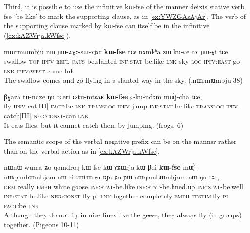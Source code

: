 \documentclass[oldfontcommands,oneside,a4paper,11pt]{article}
\newcommand{\ipa}[1]{{\phon \mbox{#1}}} %
\begin{document}
 

Third, it is possible to use the infinitive   \ipa{kɯ-fse} of the manner deixis stative verb \ipa{fse} `be like' to mark the supporting clause, as in \ref{ex:YWZGAsAjAr}. The verb of the supporting clause marked by   \ipa{kɯ-fse} can itself be in the infinitive (\ref{ex:kAZWrja.kWfse}).
\begin{exe}
\ex \label{ex:YWZGAsAjAr}
\gll
 	\ipa{mɯrmɯmbju} 	\ipa{nɯ} 	\ipa{ɲɯ-ʑɣɤ-sɯ-ɤjɤr} 	\ipa{\textbf{kɯ-fse}} 	\ipa{tɕe} 	\ipa{nɤmkʰa} 	\ipa{zɯ} 	\ipa{ku-ɕe} 	\ipa{nɤ} 	\ipa{ɲɯ-ɣi} 	\ipa{tɕe} 	\\
 	swallow \textsc{top} \textsc{ipfv-refl-caus}-be.slanted \textsc{inf:stat}-be.like \textsc{lnk} sky \textsc{loc}  \textsc{ipfv:east}-go \textsc{lnk} \textsc{ipfv:west}-come lnk \\
\glt The swallow comes and go flying in a slanted way in the sky. (mɯrmɯmbju 38)
\end{exe}

\begin{exe}
\ex \label{ex:YWZGAsAjAr}
\gll
\ipa{βɣaza}         	\ipa{tu-ndze}         	\ipa{ŋu}         	\ipa{tɕeri}         	\ipa{ɕ-tu-mtsaʁ}         	\ipa{\textbf{kɯ-fse}}         	\ipa{ɕ-ku-ndɤm}         	\ipa{mɯ́j-cha}         	\ipa{tɕe,}         \\
fly \textsc{ipfv}-eat[III] \textsc{fact}:be \textsc{lnk} \textsc{transloc-ipfv}-jump  \textsc{inf:stat}-be.like  \textsc{transloc-ipfv}-catch[III] \textsc{neg:const}-can \textsc{lnk} \\
\glt It eats flies, but it cannot catch them by jumping. (frogs, 6)
\end{exe}

The semantic scope of the verbal negative prefix can be on the manner rather than on the verbal action as in \ref{ex:kAZWrja.kWfse}.

\begin{exe}
\ex \label{ex:kAZWrja.kWfse}
\gll
\ipa{nɯnɯ} 	\ipa{wuma} 	\ipa{ʑo} 	\ipa{qomdroŋ} 	\ipa{kɯ-fse} 	\ipa{kɯ-ɤʑɯrja} 	\ipa{kɯ-βdi} 	\ipa{\textbf{kɯ-fse}} 	\ipa{mɯ́j-nɯqambɯmbjom-nɯ} 	\ipa{ri} \ipa{tɯtɯrca} 	\ipa{ʁɟa} 	\ipa{ʑo} 	\ipa{ɲɯ-nɯqambɯmbjom-nɯ} 	\ipa{ŋu} 	\ipa{tɕe,} 
\\
\textsc{dem} really \textsc{emph} white.goose  \textsc{inf:stat}-be.like  \textsc{inf:stat}-be.lined.up   \textsc{inf:stat}-be.well \textsc{inf:stat}-be.like \textsc{neg:const}-fly-pl \textsc{lnk} together completely \textsc{emph} \textsc{testim}-fly-\textsc{pl} \textsc{fact}:be \textsc{lnk} \\
\glt Although they do not fly in nice lines like the geese, they always fly (in groups) together. (Pigeons 10-11)
\end{exe}
 
\end{document}
